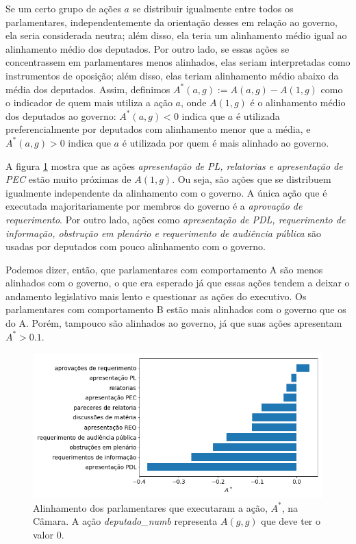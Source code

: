 \documentclass[12pt,a4paper]{article}
\begin{document}
Se um certo grupo de ações $a$ se distribuir igualmente entre todos os parlamentares, 
independentemente da orientação desses em relação ao governo, ela seria considerada neutra; além disso, ela teria um alinhamento médio igual ao alinhamento médio dos deputados. Por outro lado, se essas ações se concentrassem em parlamentares menos alinhados, elas seriam interpretadas como instrumentos de oposição; além disso, elas teriam alinhamento médio abaixo da média dos deputados. Assim, definimos 
$A^*(a,g) := A(a,g) - A(1,g)$ como o indicador de quem mais utiliza a ação $a$, 
onde $A(1,g)$ é o alinhamento médio dos deputados ao governo: $A^*(a,g)<0$ indica que 
$a$ é utilizada preferencialmente por deputados com alinhamento menor que a média, e $A^*(a,g)>0$ indica que $a$ é utilizada por quem é mais alinhado ao governo.

A figura \ref{fig:atividade-parlamentar-acao-apoio} mostra que as ações \textit{apresentação de PL, relatorias e apresentação de PEC} estão muito próximas de $A(1,g)$. Ou seja, são ações que se distribuem igualmente independente da alinhamento com o governo. A única ação que é executada majoritariamente por membros do governo é a \textit{aprovação de requerimento}. Por outro lado, ações como \textit{apresentação de PDL, requerimento de informação, obstrução em plenário e requerimento de audiência pública} são usadas por deputados com pouco alinhamento com o governo.

Podemos dizer, então, que parlamentares com comportamento A são menos alinhados com o governo, o que era esperado já que essas ações tendem a deixar o andamento legislativo mais lento e questionar as ações do executivo. Os parlamentares com comportamento B estão mais alinhados com o governo que os do A. Porém, tampouco são alinhados ao governo, já que suas ações apresentam $A^* > 0.1$.

\begin{figure}[H]
\centering
\includegraphics[width=1.0\textwidth]{graficos/camara/atividade/a_estrela.png}
\caption{Alinhamento dos parlamentares que executaram a ação, $A^*$, na Câmara. A ação \textit{deputado\_numb} representa $A(g,g)$ que deve ter o valor 0.}
\label{fig:atividade-parlamentar-acao-apoio}
\end{figure} 
\end{document}
